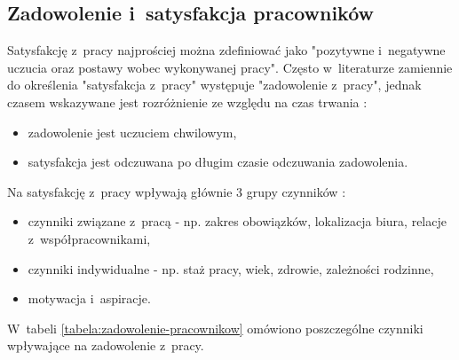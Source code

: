 
\subsection{Zadowolenie i~satysfakcja pracowników}\label{sec:czynniki-wplywajace-na-fluktuacje:zadowolenie}
Satysfakcję z~pracy najprościej można zdefiniować jako "pozytywne i~negatywne uczucia oraz postawy wobec wykonywanej pracy"\cite{shultz-2002}.
Często w~literaturze zamiennie do określenia "satysfakcja z~pracy" występuje "zadowolenie z~pracy", jednak czasem wskazywane jest rozróżnienie ze względu na czas trwania \cite{sowinska-2014}:
\begin{itemize}
    \item zadowolenie jest uczuciem chwilowym,
    \item satysfakcja jest odczuwana po długim czasie odczuwania zadowolenia.
\end{itemize}

Na satysfakcję z~pracy wpływają głównie 3 grupy czynników \cite{shultz-2002}:
\begin{itemize}
    \item czynniki związane z~pracą - np. zakres obowiązków, lokalizacja biura, relacje z~współpracownikami,
    \item czynniki indywidualne - np. staż pracy, wiek, zdrowie, zależności rodzinne,
    \item motywacja i~aspiracje.
\end{itemize}

W~tabeli \ref{tabela:zadowolenie-pracownikow} omówiono poszczególne czynniki wpływające na zadowolenie z~pracy.


